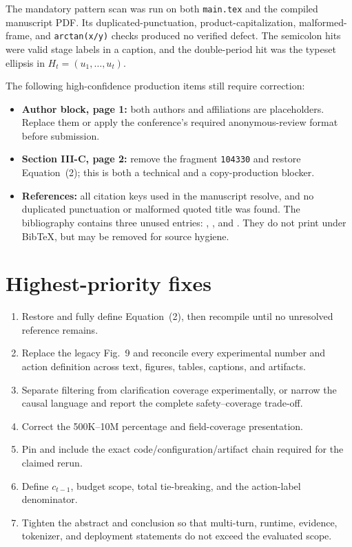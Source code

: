\documentclass[11pt]{article}
\begin{document}
The mandatory pattern scan was run on both \texttt{main.tex} and the compiled manuscript PDF.  Its duplicated-punctuation, product-capitalization, malformed-frame, and \texttt{arctan(x/y)} checks produced no verified defect.  The semicolon hits were valid stage labels in a caption, and the double-period hit was the typeset ellipsis in $H_t=(u_1,\ldots,u_t)$.

The following high-confidence production items still require correction:
\begin{itemize}
  \item \textbf{Author block, page 1:} both authors and affiliations are placeholders.  Replace them or apply the conference's required anonymous-review format before submission.
  \item \textbf{Section III-C, page 2:} remove the fragment \texttt{104330} and restore Equation~(2); this is both a technical and a copy-production blocker.
  \item \textbf{References:} all citation keys used in the manuscript resolve, and no duplicated punctuation or malformed quoted title was found.  The bibliography contains three unused entries: , , and .  They do not print under Bib\TeX, but may be removed for source hygiene.
\end{itemize}

\section*{Highest-priority fixes}

\begin{enumerate}
  \item Restore and fully define Equation~(2), then recompile until no unresolved reference remains.
  \item Replace the legacy Fig.~9 and reconcile every experimental number and action definition across text, figures, tables, captions, and artifacts.
  \item Separate filtering from clarification coverage experimentally, or narrow the causal language and report the complete safety--coverage trade-off.
  \item Correct the 500K--10M percentage and field-coverage presentation.
  \item Pin and include the exact code/configuration/artifact chain required for the claimed rerun.
  \item Define $c_{t-1}$, budget scope, total tie-breaking, and the action-label denominator.
  \item Tighten the abstract and conclusion so that multi-turn, runtime, evidence, tokenizer, and deployment statements do not exceed the evaluated scope.
\end{enumerate}
\end{document}
